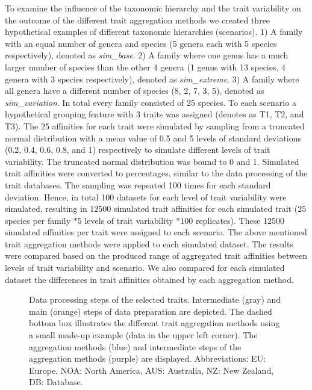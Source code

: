 \documentclass{article}
\begin{document}
To examine the influence of the taxonomic hierarchy and the trait variability on the outcome of the different trait aggregation methods we created three hypothetical examples of different taxonomic hierarchies (scenarios). 
1) A family with an equal number of genera and species (5 genera each with 5 species respectively), denoted as \textit{sim\_base}.
2) A family where one genus has a much larger number of species than the other 4 genera (1 genus with 13 species, 4 genera with 3 species respectively), denoted as \textit{sim\_extreme}. 
3) A family where all genera have a different number of species (8, 2, 7, 3, 5), denoted as \textit{sim\_variation}. In total every family consisted of 25 species. To each scenario a hypothetical grouping feature with 3 traits was assigned (denotes as T1, T2, and T3). The 25 affinities for each trait were simulated by sampling from a truncated normal distribution with a mean value of 0.5 and 5 levels of standard deviations (0.2, 0.4, 0.6, 0.8, and 1) respectively to simulate different levels of trait variability. The truncated normal distribution was bound to 0 and 1. Simulated trait affinities were converted to percentages, similar to the data processing of the trait databases. The sampling was repeated 100 times for each standard deviation. Hence, in total 100 datasets for each level of trait variability were simulated, resulting in 12500 simulated trait affinities for each simulated trait ($25$ species per family $* 5$ levels of trait variability $* 100$ replicates). These 12500 simulated affinities per trait were assigned to each scenario. The above mentioned trait aggregation methods were applied to each simulated dataset. 
The results were compared based on the produced range of aggregated trait affinities between levels of trait variability and scenario. We also compared for each simulated dataset the differences in trait affinities obtained by each aggregation method.  

\begin{figure}
  \centering
  
  \caption{Data processing steps of the selected traits. Intermediate (gray) and main (orange) steps of data preparation are depicted. The dashed bottom box illustrates the different trait aggregation methods using a small made-up example (data in the upper left corner). The aggregation methods (blue) and intermediate steps of the aggregation methods (purple) are displayed. Abbreviations: EU: Europe, NOA: North America, AUS: Australia, NZ: New Zealand, DB: Database.}
  \label{fig:data_proc_overview}
\end{figure}
\end{document}
